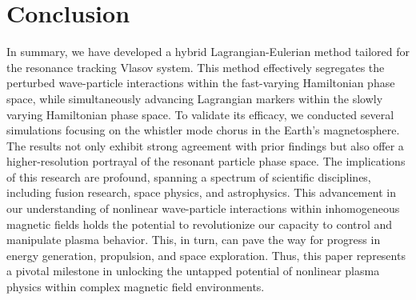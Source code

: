 \section{Conclusion}
\label{sec:end}
In summary, we have developed a hybrid Lagrangian-Eulerian method tailored for the resonance tracking Vlasov system. This method effectively segregates the perturbed wave-particle interactions within the fast-varying Hamiltonian phase space, while simultaneously advancing Lagrangian markers within the slowly varying Hamiltonian phase space. To validate its efficacy, we conducted several simulations focusing on the whistler mode chorus in the Earth's magnetosphere. The results not only exhibit strong agreement with prior findings but also offer a higher-resolution portrayal of the resonant particle phase space.
The implications of this research are profound, spanning a spectrum of scientific disciplines, including fusion research, space physics, and astrophysics. This advancement in our understanding of nonlinear wave-particle interactions within inhomogeneous magnetic fields holds the potential to revolutionize our capacity to control and manipulate plasma behavior. This, in turn, can pave the way for progress in energy generation, propulsion, and space exploration. Thus, this paper represents a pivotal milestone in unlocking the untapped potential of nonlinear plasma physics within complex magnetic field environments.